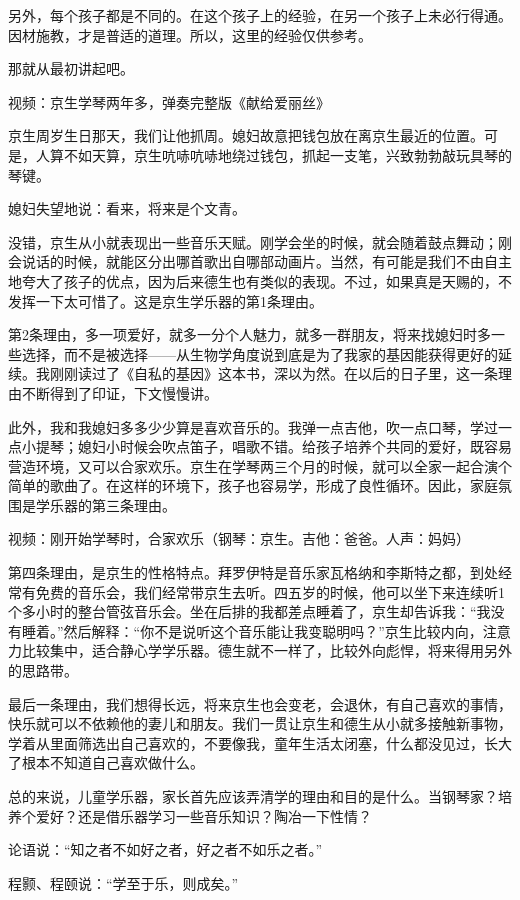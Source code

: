 \documentclass[twoside,openright,headings=optiontohead]{ctexbook} %
\begin{document}
{另外，每个孩子都是不同的。在这个孩子上的经验，在另一个孩子上未必行得通。因材施教，才是普适的道理。所以，这里的经验仅供参考。

那就从最初讲起吧。

视频：京生学琴两年多，弹奏完整版《献给爱丽丝》

京生周岁生日那天，我们让他抓周。媳妇故意把钱包放在离京生最近的位置。可是，人算不如天算，京生吭哧吭哧地绕过钱包，抓起一支笔，兴致勃勃敲玩具琴的琴键。

媳妇失望地说：看来，将来是个文青。

没错，京生从小就表现出一些音乐天赋。刚学会坐的时候，就会随着鼓点舞动；刚会说话的时候，就能区分出哪首歌出自哪部动画片。当然，有可能是我们不由自主地夸大了孩子的优点，因为后来德生也有类似的表现。不过，如果真是天赐的，不发挥一下太可惜了。这是京生学乐器的第1条理由。

第2条理由，多一项爱好，就多一分个人魅力，就多一群朋友，将来找媳妇时多一些选择，而不是被选择------从生物学角度说到底是为了我家的基因能获得更好的延续。我刚刚读过了《自私的基因》这本书，深以为然。在以后的日子里，这一条理由不断得到了印证，下文慢慢讲。

此外，我和我媳妇多多少少算是喜欢音乐的。我弹一点吉他，吹一点口琴，学过一点小提琴；媳妇小时候会吹点笛子，唱歌不错。给孩子培养个共同的爱好，既容易营造环境，又可以合家欢乐。京生在学琴两三个月的时候，就可以全家一起合演个简单的歌曲了。在这样的环境下，孩子也容易学，形成了良性循环。因此，家庭氛围是学乐器的第三条理由。

视频：刚开始学琴时，合家欢乐（钢琴：京生。吉他：爸爸。人声：妈妈）

第四条理由，是京生的性格特点。拜罗伊特是音乐家瓦格纳和李斯特之都，到处经常有免费的音乐会，我们经常带京生去听。四五岁的时候，他可以坐下来连续听1个多小时的整台管弦音乐会。坐在后排的我都差点睡着了，京生却告诉我：``我没有睡着。''然后解释：``你不是说听这个音乐能让我变聪明吗？''京生比较内向，注意力比较集中，适合静心学学乐器。德生就不一样了，比较外向彪悍，将来得用另外的思路带。

最后一条理由，我们想得长远，将来京生也会变老，会退休，有自己喜欢的事情，快乐就可以不依赖他的妻儿和朋友。我们一贯让京生和德生从小就多接触新事物，学着从里面筛选出自己喜欢的，不要像我，童年生活太闭塞，什么都没见过，长大了根本不知道自己喜欢做什么。

总的来说，儿童学乐器，家长首先应该弄清学的理由和目的是什么。当钢琴家？培养个爱好？还是借乐器学习一些音乐知识？陶冶一下性情？

论语说：``知之者不如好之者，好之者不如乐之者。''

程颢、程颐说：``学至于乐，则成矣。''

}
\end{document}
